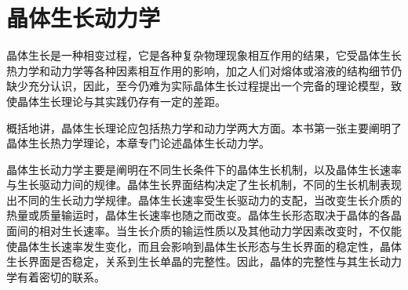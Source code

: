 ﻿\chapter{晶体生长动力学}

晶体生长是一种相变过程，它是各种复杂物理现象相互作用的结果，它受晶体生长热力学和动力学等各种因素相互作用的影响，加之人们对熔体或溶液的结构细节仍缺少充分认识，因此，至今仍难为实际晶体生长过程提出一个完备的理论模型，致使晶体生长理论与其实践仍存有一定的差距。

概括地讲，晶体生长理论应包括热力学和动力学两大方面。本书第一张主要阐明了晶体生长热力学理论，本章专门论述晶体生长动力学。

晶体生长动力学主要是阐明在不同生长条件下的晶体生长机制，以及晶体生长速率与生长驱动力间的规律。晶体生长界面结构决定了生长机制，不同的生长机制表现出不同的生长动力学规律。晶体生长速率受生长驱动力的支配，当改变生长介质的热量或质量输运时，晶体生长速率也随之而改变。晶体生长形态取决于晶体的各晶面间的相对生长速率。当生长介质的输运性质以及其他动力学因素改变时，不仅能使晶体生长速率发生变化，而且会影响到晶体生长形态与生长界面的稳定性，晶体生长界面是否稳定，关系到生长单晶的完整性。因此，晶体的完整性与其生长动力学有着密切的联系。








